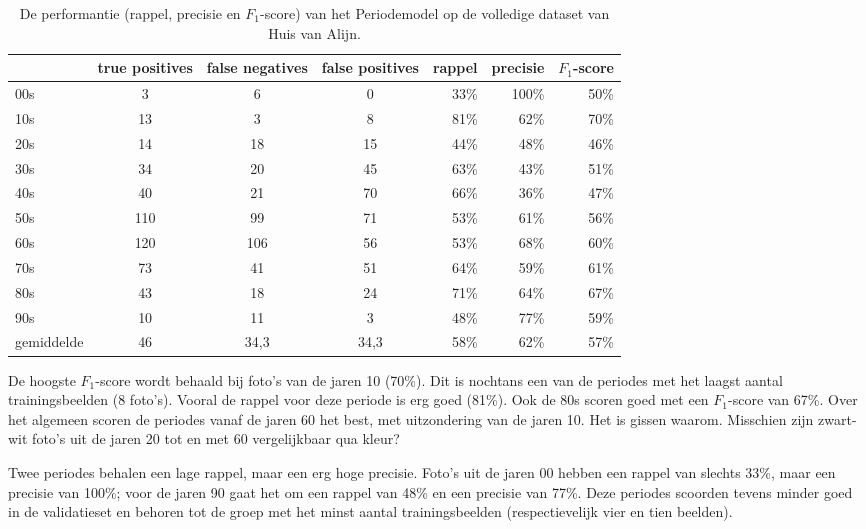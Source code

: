 \begin{table}
	\centering
    \renewcommand\arraystretch{1.2}
    \begin{tabular}{l|ccc|rrr}
        \toprule
        & true positives  & false negatives & false positives & rappel & precisie & $F_1$-score \\ 
        \midrule
        00s & 3 & 6 & 0 & 33\% & 100\% & 50\% \\ 
        10s & 13 & 3 & 8 &  81\% & 62\% & 70\% \\ 
        20s & 14 & 18 & 15 & 44\% & 48\% & 46\% \\ 
        30s & 34 & 20 & 45  & 63\% & 43\% & 51\% \\ 
        40s & 40 & 21 & 70  & 66\% & 36\% & 47\% \\ 
        50s & 110 & 99 & 71  & 53\% & 61\% & 56\% \\ 
        60s & 120 & 106 & 56  & 53\% & 68\% & 60\% \\ 
        70s & 73 & 41 & 51  & 64\% & 59\% & 61\% \\ 
        80s & 43 & 18 & 24  & 71\% & 64\% & 67\% \\ 
        90s & 10 & 11 & 3  & 48\% & 77\% & 59\% \\ 
        \midrule
        gemiddelde & 46 & 34,3 & 34,3  & 58\% & 62\% & 57\% \\ 
        \bottomrule
    \end{tabular} 
    \caption{De performantie (rappel, precisie en $F_1$-score) van het Periodemodel op de volledige dataset van Huis van Alijn.}
    \label{tab:resultaten-periodemodel}
\end{table}

De hoogste $F_1$-score wordt behaald bij foto’s van de jaren 10 (70\%). Dit is nochtans een van de periodes met het laagst aantal trainingsbeelden (8 foto's). Vooral de rappel voor deze periode is erg goed (81\%). Ook de 80s scoren goed met een $F_1$-score van 67\%. Over het algemeen scoren de periodes vanaf de jaren 60 het best, met uitzondering van de jaren 10. Het is gissen waarom. Misschien zijn zwart-wit foto’s uit de jaren 20 tot en met 60 vergelijkbaar qua kleur?

Twee periodes behalen een lage rappel, maar een erg hoge precisie. Foto’s uit de jaren 00 hebben een rappel van slechts 33\%, maar een precisie van 100\%; voor de jaren 90 gaat het om een rappel van 48\% en een precisie van 77\%. Deze periodes scoorden tevens minder goed in de validatieset en behoren tot de groep met het minst aantal trainingsbeelden (respectievelijk vier en tien beelden). 

